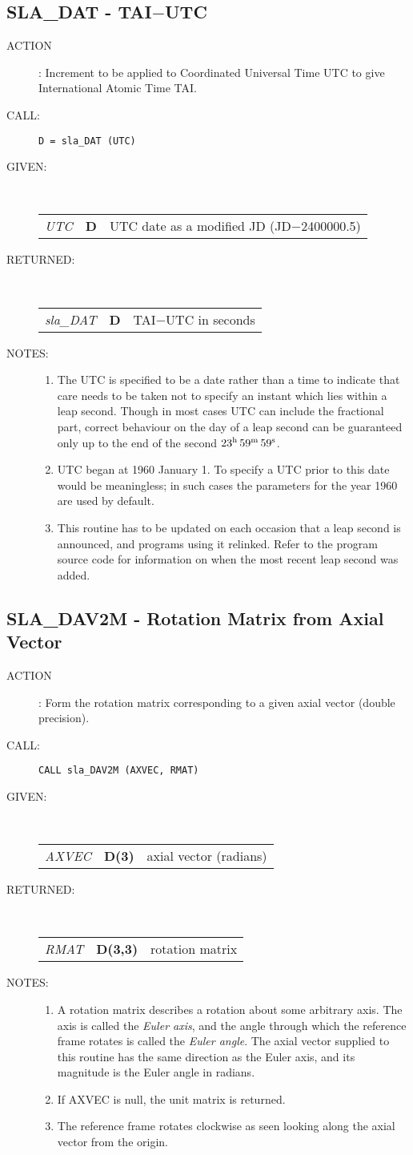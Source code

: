 \documentclass[11pt,twoside]{article}
\newcommand{\xlabel}[1]{}
\newcommand{\routine}[3]
{\hbadness=10000
  \vbox
  {
    \rule{\textwidth}{0.3mm}\\
    {\Large {\bf #1} \hfill #2 \hfill {\bf #1}}\\
    \setlength{\oldspacing}{\topsep}
    \setlength{\topsep}{0.3ex}
    \begin{description}
      #3
    \end{description}
    \setlength{\topsep}{\oldspacing}
  }
}
\renewcommand{\routine}[3]
   {
      \subsection{#1\xlabel{#1} - #2\label{#1}}
       \begin{description}
         #3
       \end{description}
   }
\newcommand{\action}[1]
{\item[ACTION]: #1}
\newcommand{\action}[1]
   {\item[ACTION:] #1}
\newcommand{\call}[1]
{\item[CALL]: \hspace{0.4em}{\tt #1}}
\newlength{\oldspacing}
\renewcommand{\call}[1]
   {
    \item[CALL:] {\tt #1}
   }
\newcommand{\args}[2]
{
  \goodbreak
  \setlength{\oldspacing}{\topsep}
  \setlength{\topsep}{0.3ex}
  \begin{description}
  \item[#1]:\\[1.5ex]
    \begin{tabular}{p{7em}p{6em}p{22em}}
      #2
    \end{tabular}
  \end{description}
  \setlength{\topsep}{\oldspacing}
}
\renewcommand{\args}[2]
   {
     \begin{description}
        \item[#1:]\\
        \begin{tabular}{p{7em}p{6em}l}
           #2
        \end{tabular}
     \end{description}
   }
\newcommand{\spec}[3]
{
  {\em {#1}} & {\bf \mbox{#2}} & {#3}
}
\newcommand{\notes}[1]
{
  \goodbreak
  \setlength{\oldspacing}{\topsep}
  \setlength{\topsep}{0.3ex}
  \begin{description}
    \item[NOTES]:
        #1
  \end{description}
  \setlength{\topsep}{\oldspacing}
}
\renewcommand{\notes}[1]
   {
      \begin{description}
         \item[NOTES:]
            #1
      \end{description}
   }
\begin{document}
\routine{SLA\_DAT}{TAI$-$UTC}
{
 \action{Increment to be applied to Coordinated Universal Time UTC to give
         International Atomic Time TAI.}
 \call{D~=~sla\_DAT (UTC)}
}
\args{GIVEN}
{
 \spec{UTC}{D}{UTC date as a modified JD (JD$-$2400000.5)}
}
\args{RETURNED}
{
 \spec{sla\_DAT}{D}{TAI$-$UTC in seconds}
}
\notes
{
 \begin{enumerate}
 \item The UTC is specified to be a date rather than a time to indicate
       that care needs to be taken not to specify an instant which lies
       within a leap second.  Though in most cases UTC can include the
       fractional part, correct behaviour on the day of a leap second
       can be guaranteed only up to the end of the second
       $23^{\rm h}\,59^{\rm m}\,59^{\rm s}$.
 \item UTC began at 1960 January 1.  To specify a UTC prior to this
       date would be meaningless;  in such cases the parameters
       for the year 1960 are used by default.
 \item This routine has to be updated on each occasion that a
       leap second is announced, and programs using it relinked.
       Refer to the program source code for information on when the
       most recent leap second was added.
 \end{enumerate}
}
\routine{SLA\_DAV2M}{Rotation Matrix from Axial Vector}
{
 \action{Form the rotation matrix corresponding to a given axial vector
         (double precision).}
 \call{CALL sla\_DAV2M (AXVEC, RMAT)}
}
\args{GIVEN}
{
 \spec{AXVEC}{D(3)}{axial vector (radians)}
}
\args{RETURNED}
{
 \spec{RMAT}{D(3,3)}{rotation matrix}
}
\notes
{
 \begin{enumerate}
  \item A rotation matrix describes a rotation about some arbitrary axis.
        The axis is called the {\it Euler axis}, and the angle through which the
        reference frame rotates is called the {\it Euler angle}.  The axial
        vector supplied to this routine has the same direction as the
        Euler axis, and its magnitude is the Euler angle in radians.
  \item If AXVEC is null, the unit matrix is returned.
  \item The reference frame rotates clockwise as seen looking along
        the axial vector from the origin.
 \end{enumerate}
}
\end{document}
